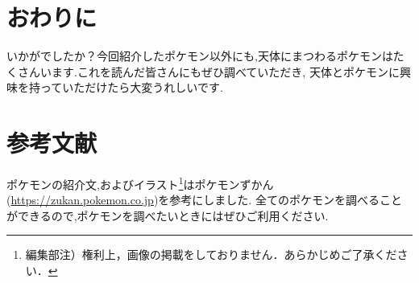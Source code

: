 \documentclass[../../super_nova_2023]{subfiles}
\begin{document}
\section{おわりに}
いかがでしたか？今回紹介したポケモン以外にも,天体にまつわるポケモンはたくさんいます.これを読んだ皆さんにもぜひ調べていただき,
天体とポケモンに興味を持っていただけたら大変うれしいです.
\section{参考文献}
ポケモンの紹介文,およびイラスト\footnote{編集部注）権利上，画像の掲載をしておりません．あらかじめご了承ください．}はポケモンずかん(\url{https://zukan.pokemon.co.jp})を参考にしました.
全てのポケモンを調べることができるので,ポケモンを調べたいときにはぜひご利用ください.
\end{document}
